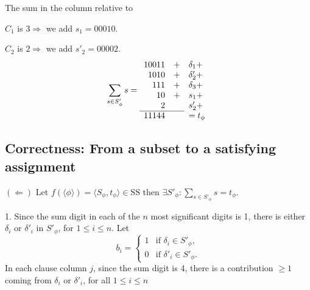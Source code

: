 The sum in the column relative to

$C_1$ is $3\Rightarrow$ we add $s_1=00010$.

$C_2$ is $2\Rightarrow$ we add $s'_2=00002$.
\[
\sum_{s\in S'_\phi}s=
\begin{array}{rrl}
10011&+&\delta_1+\\
1010&+&\delta'_2+\\
111&+&\delta_3+\\
10&+&s_1+\\
2&&s'_2+\\\cline{1-2}
11144&&=t_\phi
\end{array}
\]
\subsection{Correctness: From a subset to a satisfying assignment}
$(\Leftarrow)$ Let $f(\langle\phi\rangle)=\langle S_\phi,t_\phi\rangle\in\mathrm{SS}$ then $\exists S'_\phi:\sum_{s\in S'_\phi}s=t_\phi$.

1. Since the sum digit in each of the $n$ most significant digits is 1, there is either $\delta_i$ or $\delta'_i$ in $S'_\phi$, for $1\leq i\leq n$.
Let
\[
b_i=\begin{cases}1&\text{if }\delta_i\in S'_\phi,\\0&\text{if }\delta'_i\in S'_\phi.\end{cases}
\]
In each clause column $j$, since the sum digit is 4, there is a contribution $\geq1$ coming from $\delta_i$ or $\delta'_i$, for all $1\leq i\leq n$
